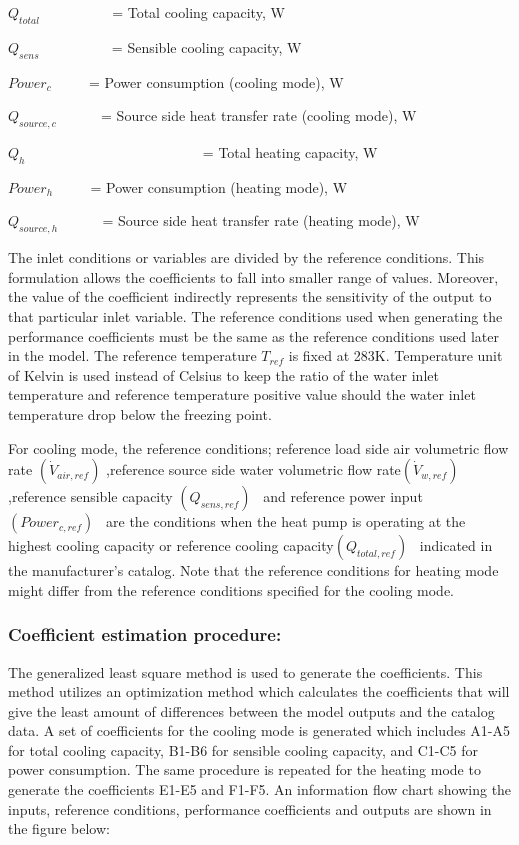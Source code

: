 \({Q_{total}}\) ~~~~~~~~~ = Total cooling capacity, W

\({Q_{sens}}\) ~~~~~~~~~ = Sensible cooling capacity, W

\(Powe{r_c}\) ~~~~ = Power consumption (cooling mode), W

\({Q_{source,c}}\) ~~~~~ = Source side heat transfer rate (cooling mode), W

\({Q_h}\) ~~~~~~~~~~~~~~~~~~~~~~~~ = Total heating capacity, W

\(Powe{r_h}\) ~~~~ = Power consumption (heating mode), W

\({Q_{source,h}}\) ~~~~~ = Source side heat transfer rate (heating mode), W

The inlet conditions or variables are divided by the reference conditions. This formulation allows the coefficients to fall into smaller range of values. Moreover, the value of the coefficient indirectly represents the sensitivity of the output to that particular inlet variable. The reference conditions used when generating the performance coefficients must be the same as the reference conditions used later in the model. The reference temperature \({T_{ref}}\) is fixed at 283K. Temperature unit of Kelvin is used instead of Celsius to keep the ratio of the water inlet temperature and reference temperature positive value should the water inlet temperature drop below the freezing point.

For cooling mode, the reference conditions; reference load side air volumetric flow rate \(\left( {{{\dot V}_{air,ref}}} \right)\) ,reference source side water volumetric flow rate\(\left( {{{\dot V}_{w,ref}}} \right)\) ,reference sensible capacity \(\left( {{Q_{sens,ref}}} \right)\) ~and reference power input \(\left( {Powe{r_{c,ref}}} \right)\) ~are the conditions when the heat pump is operating at the highest cooling capacity or reference cooling capacity\(\left( {{Q_{total,ref}}} \right)\) ~indicated in the manufacturer's catalog. Note that the reference conditions for heating mode might differ from the reference conditions specified for the cooling mode.

\subsubsection{Coefficient estimation procedure:}\label{coefficient-estimation-procedure}

The generalized least square method is used to generate the coefficients. This method utilizes an optimization method which calculates the coefficients that will give the least amount of differences between the model outputs and the catalog data. A set of coefficients for the cooling mode is generated which includes A1-A5 for total cooling capacity, B1-B6 for sensible cooling capacity, and C1-C5 for power consumption. The same procedure is repeated for the heating mode to generate the coefficients E1-E5 and F1-F5. An information flow chart showing the inputs, reference conditions, performance coefficients and outputs are shown in the figure below:

